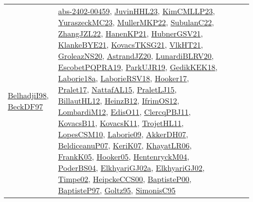 {\begin{longtable}{lp{3cm}>{\raggedright}p{6cm}>{\raggedright}p{6cm}p{8cm}}
\href{articles/BelhadjiI98.pdf}{BelhadjiI98}\cite{BelhadjiI98}, \href{papers/BeckDF97.pdf}{BeckDF97}\cite{BeckDF97} & \href{articles/abs-2402-00459.pdf}{abs-2402-00459}\cite{abs-2402-00459}, \href{papers/JuvinHHL23.pdf}{JuvinHHL23}\cite{JuvinHHL23}, \href{papers/KimCMLLP23.pdf}{KimCMLLP23}\cite{KimCMLLP23}, \href{papers/YuraszeckMC23.pdf}{YuraszeckMC23}\cite{YuraszeckMC23}, \href{articles/MullerMKP22.pdf}{MullerMKP22}\cite{MullerMKP22}, \href{articles/SubulanC22.pdf}{SubulanC22}\cite{SubulanC22}, \href{papers/ZhangJZL22.pdf}{ZhangJZL22}\cite{ZhangJZL22}, \href{papers/HanenKP21.pdf}{HanenKP21}\cite{HanenKP21}, \href{articles/HubnerGSV21.pdf}{HubnerGSV21}\cite{HubnerGSV21}, \href{papers/KlankeBYE21.pdf}{KlankeBYE21}\cite{KlankeBYE21}, \href{papers/KovacsTKSG21.pdf}{KovacsTKSG21}\cite{KovacsTKSG21}, \href{articles/VlkHT21.pdf}{VlkHT21}\cite{VlkHT21}, \href{papers/GroleazNS20.pdf}{GroleazNS20}\cite{GroleazNS20}, \href{articles/AstrandJZ20.pdf}{AstrandJZ20}\cite{AstrandJZ20}, \href{articles/LunardiBLRV20.pdf}{LunardiBLRV20}\cite{LunardiBLRV20}, \href{articles/EscobetPQPRA19.pdf}{EscobetPQPRA19}\cite{EscobetPQPRA19}, \href{papers/ParkUJR19.pdf}{ParkUJR19}\cite{ParkUJR19}, \href{articles/GedikKEK18.pdf}{GedikKEK18}\cite{GedikKEK18}, \href{papers/Laborie18a.pdf}{Laborie18a}\cite{Laborie18a}, \href{articles/LaborieRSV18.pdf}{LaborieRSV18}\cite{LaborieRSV18}, \href{papers/Hooker17.pdf}{Hooker17}\cite{Hooker17}, \href{papers/Pralet17.pdf}{Pralet17}\cite{Pralet17}, \href{articles/NattafAL15.pdf}{NattafAL15}\cite{NattafAL15}, \href{papers/PraletLJ15.pdf}{PraletLJ15}\cite{PraletLJ15}, \href{papers/BillautHL12.pdf}{BillautHL12}\cite{BillautHL12}, \href{papers/HeinzB12.pdf}{HeinzB12}\cite{HeinzB12}, \href{papers/IfrimOS12.pdf}{IfrimOS12}\cite{IfrimOS12}, \href{articles/LombardiM12.pdf}{LombardiM12}\cite{LombardiM12}, \href{papers/EdisO11.pdf}{EdisO11}\cite{EdisO11}, \href{papers/ClercqPBJ11.pdf}{ClercqPBJ11}\cite{ClercqPBJ11}, \href{articles/KovacsB11.pdf}{KovacsB11}\cite{KovacsB11}, \href{articles/KovacsK11.pdf}{KovacsK11}\cite{KovacsK11}, \href{articles/TrojetHL11.pdf}{TrojetHL11}\cite{TrojetHL11}, \href{articles/LopesCSM10.pdf}{LopesCSM10}\cite{LopesCSM10}, \href{papers/Laborie09.pdf}{Laborie09}\cite{Laborie09}, \href{papers/AkkerDH07.pdf}{AkkerDH07}\cite{AkkerDH07}, \href{papers/BeldiceanuP07.pdf}{BeldiceanuP07}\cite{BeldiceanuP07}, \href{papers/KeriK07.pdf}{KeriK07}\cite{KeriK07}, \href{articles/KhayatLR06.pdf}{KhayatLR06}\cite{KhayatLR06}, \href{papers/FrankK05.pdf}{FrankK05}\cite{FrankK05}, \href{articles/Hooker05.pdf}{Hooker05}\cite{Hooker05}, \href{papers/HentenryckM04.pdf}{HentenryckM04}\cite{HentenryckM04}, \href{articles/PoderBS04.pdf}{PoderBS04}\cite{PoderBS04}, \href{papers/ElkhyariGJ02a.pdf}{ElkhyariGJ02a}\cite{ElkhyariGJ02a}, \href{papers/ElkhyariGJ02.pdf}{ElkhyariGJ02}\cite{ElkhyariGJ02}, \href{articles/Timpe02.pdf}{Timpe02}\cite{Timpe02}, \href{articles/HeipckeCCS00.pdf}{HeipckeCCS00}\cite{HeipckeCCS00}, \href{articles/BaptisteP00.pdf}{BaptisteP00}\cite{BaptisteP00}, \href{papers/BaptisteP97.pdf}{BaptisteP97}\cite{BaptisteP97}, \href{papers/Goltz95.pdf}{Goltz95}\cite{Goltz95}, \href{papers/SimonisC95.pdf}{SimonisC95}\cite{SimonisC95}\\

\end{longtable}}

